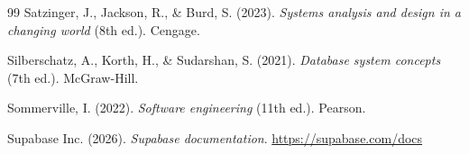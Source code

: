 \begin{thebibliography}{99}
Satzinger, J., Jackson, R., \& Burd, S. (2023). \textit{Systems analysis and design in a changing world} (8th ed.). Cengage.

Silberschatz, A., Korth, H., \& Sudarshan, S. (2021). \textit{Database system concepts} (7th ed.). McGraw-Hill.

Sommerville, I. (2022). \textit{Software engineering} (11th ed.). Pearson.

Supabase Inc. (2026). \textit{Supabase documentation}. \url{https://supabase.com/docs}

\end{thebibliography}
\endgroup
